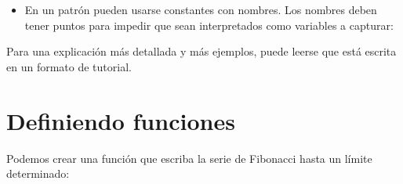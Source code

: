 \documentclass[a4,10pt,spanish]{sphinxmanual}
\begin{document}
\begin{itemize}
\item {} 
\sphinxAtStartPar
En un patrón pueden usarse constantes con nombres. Los nombres deben tener puntos para impedir que sean interpretados como variables a capturar:

\begin{sphinxVerbatim}[commandchars=\\\{\}]
   
 
      
      
      

 
     
     
     
\end{sphinxVerbatim}

\end{itemize}

\sphinxAtStartPar
Para una explicación más detallada y más ejemplos, puede leerse  que está escrita en un formato de tutorial.


\section{Definiendo funciones}
\label{\detokenize{tutorial/controlflow:defining-functions}}\label{\detokenize{tutorial/controlflow:tut-functions}}
\sphinxAtStartPar
Podemos crear una función que escriba la serie de Fibonacci hasta un límite determinado:
\end{document}
